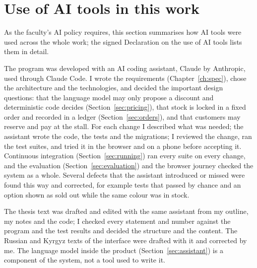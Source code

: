 \section{Use of AI tools in this work}
\label{sec:ai-use}

As the faculty's AI policy requires, this section summarises how AI tools were used across the whole work; the signed
Declaration on the use of AI tools lists them in detail.

The program was developed with an AI coding assistant, Claude by Anthropic, used through Claude Code. I wrote the
requirements (Chapter~\ref{ch:spec}), chose the architecture and the technologies, and decided the important design
questions: that the language model may only propose a discount and deterministic code decides
(Section~\ref{sec:pricing}), that stock is locked in a fixed order and recorded in a ledger
(Section~\ref{sec:orders}), and that customers may reserve and pay at the stall. For each change I described what was
needed; the assistant wrote the code, the tests and the migrations; I reviewed the change, ran the test suites, and
tried it in the browser and on a phone before accepting it. Continuous integration (Section~\ref{sec:running}) ran every
suite on every change, and the evaluation (Section~\ref{sec:evaluation}) and the browser journey checked the system as a
whole. Several defects that the assistant introduced or missed were found this way and corrected, for example tests that
passed by chance and an option shown as sold out while the same colour was in stock.

The thesis text was drafted and edited with the same assistant from my outline, my notes and the code; I checked every
statement and number against the program and the test results and decided the structure and the content. The Russian
and Kyrgyz texts of the interface were drafted with it and corrected by me. The language model inside the product
(Section~\ref{sec:assistant}) is a component of the system, not a tool used to write it.

